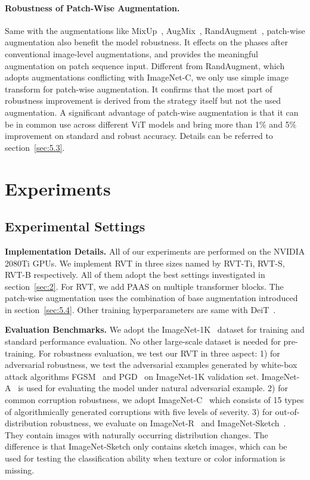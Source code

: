 \documentclass[10pt,twocolumn,letterpaper]{article}
\begin{document}
\paragraph{Robustness of Patch-Wise Augmentation.} Same with the augmentations like MixUp~\cite{zhang2017mixup}, AugMix~\cite{hendrycks2019augmix}, RandAugment~\cite{cubuk2020randaugment}, patch-wise augmentation also benefit the model robustness. It effects on the phases after conventional image-level augmentations, and provides the meaningful augmentation on patch sequence input. Different from RandAugment, which adopts augmentations conflicting with ImageNet-C, we only use simple image transform for patch-wise augmentation. It confirms that the most part of robustness improvement is derived from the strategy itself but not the used augmentation.
A significant advantage of patch-wise augmentation is that it can be in common use across different ViT models and bring more than 1\% and 5\% improvement on standard and robust accuracy. Details can be referred to section~\ref{sec:5.3}.

\section{Experiments}
\subsection{Experimental Settings}
\label{sec:6.1}
\textbf{Implementation Details.} All of our experiments are performed on the NVIDIA 2080Ti GPUs. We implement RVT in three sizes named by RVT-Ti, RVT-S, RVT-B respectively. All of them adopt the best settings investigated in section~\ref{sec:2}. For RVT, we add PAAS on multiple transformer blocks. The patch-wise augmentation uses the combination of base augmentation introduced in section~\ref{sec:5.4}. Other training hyperparameters are same with DeiT~\cite{touvron2020training}.

\textbf{Evaluation Benchmarks.} We adopt the ImageNet-1K~\cite{deng2009imagenet} dataset for training and standard performance evaluation. No other large-scale dataset is needed for pre-training. For robustness evaluation, we test our RVT in three aspect: 1) for adversarial robustness, we test the adversarial examples generated by white-box attack algorithms FGSM~\cite{goodfellow2014explaining} and PGD~\cite{madry2017towards} on ImageNet-1K validation set. ImageNet-A~\cite{hendrycks2019natural} is used for evaluating the model under natural adversarial example. 2) for common corruption robustness, we adopt ImageNet-C~\cite{hendrycks2019benchmarking} which consists of 15 types of algorithmically generated
corruptions with five levels of severity. 3) for out-of-distribution robustness, we evaluate on ImageNet-R~\cite{hendrycks2020many} and ImageNet-Sketch~\cite{wang2019learning}. They contain images with naturally occurring distribution changes. The difference is that ImageNet-Sketch only contains sketch images, which can be used for testing the classification ability when texture or color information is missing.
\end{document}
